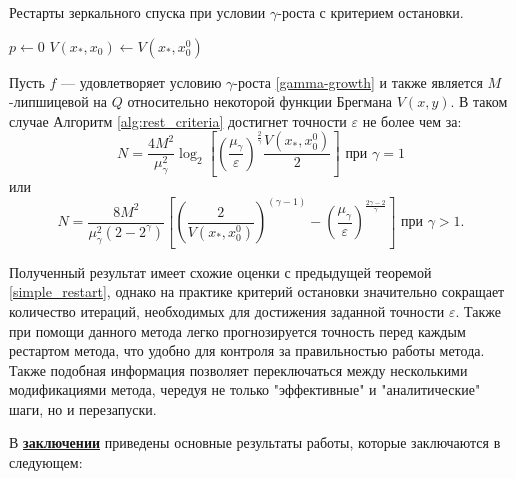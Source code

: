  \begin{algorithm}[htp]
     \caption{Рестарты зеркального спуска при условии $\gamma$-роста с критерием остановки.}
     \label{alg:rest_criteria}
     $p \gets 0$\;
     $V(x_*, x_0) \gets V(x_*,x_0^0)$\;
 \end{algorithm}
 \begin{theorem}
     Пусть $f$ --- удовлетворяет условию $\gamma$-роста \eqref{gamma-growth} и также является $M$-липшицевой на $Q$ относительно некоторой функции Брегмана $V(x, y)$. В таком случае Алгоритм \ref{alg:rest_criteria} достигнет точности $\varepsilon$ не более чем за:
     \begin{equation}
        N =  \frac{4 M^2}{\mu_{\gamma}^2} \log_2{\left[\left(\frac{\mu_{\gamma}}{\varepsilon}\right)^{\frac{2}{\gamma}} \frac{V(x_*, x_0^0)}{2}\right]} \text{ при } \gamma = 1
    \end{equation}
    или
    \begin{equation}
        N = \frac{8  M^2}{\mu_{\gamma}^2 (2 - 2^{\gamma})} \left[ \left(\frac{2}{V(x_*, x_0^0)}\right)^{(\gamma - 1)}  - \left(\frac{\mu_{\gamma}}{\varepsilon}\right)^{\frac{2\gamma - 2}{\gamma}} \right] \text{ при } \gamma > 1.
    \end{equation}
 \end{theorem}

 Полученный результат имеет схожие оценки с предыдущей теоремой \ref{simple_restart}, однако на практике критерий остановки значительно сокращает количество итераций, необходимых для достижения заданной точности $\varepsilon$. Также при помощи данного метода легко прогнозируется точность перед каждым рестартом метода, что удобно для контроля за правильностью работы метода. Также подобная информация позволяет переключаться между несколькими модификациями метода, чередуя не только "эффективные" и "аналитические" шаги, но и перезапуски.  

\FloatBarrier
{}                                  %
В \underline{\textbf{заключении}} приведены основные результаты работы, которые заключаются в следующем:


